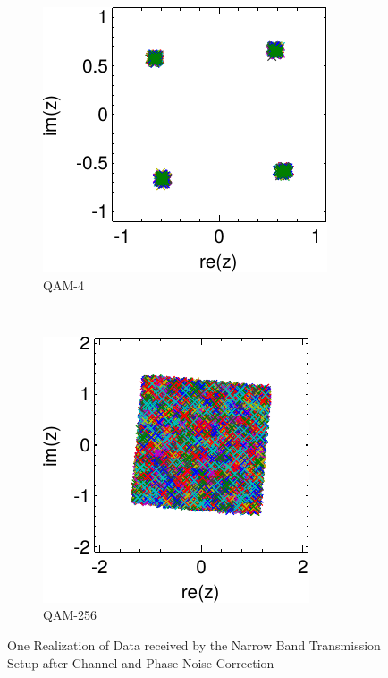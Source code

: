 \begin{figure}[p]
  \centering
  \begin{subfigure}{0.45\textwidth}
    \centering
    \includegraphics[width=\textwidth]{figures/matlab/res_450_qam4_cp_corr_pcorr}
    \caption{\gls{QAM}-4}
    \label{fig:res_450_qam4_cp_corr_pcorr}
  \end{subfigure}
  ~
  \begin{subfigure}{0.45\textwidth}
    \centering
    \includegraphics[width=\textwidth]{figures/matlab/res_450_qam256_cp_corr_pcorr}
    \caption{\gls{QAM}-256}
    \label{fig:res_450_qam256_cp_corr_pcorr}
  \end{subfigure}
  \caption{One Realization of Data received by the Narrow Band
    Transmission Setup after Channel and Phase Noise Correction}
  \label{fig:res_450_cp_corr_pcorr}
\end{figure}

